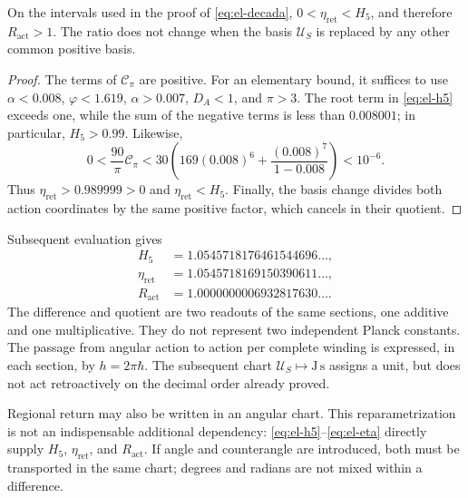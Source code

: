 \begin{proposition}
On the intervals used in the proof of \eqref{eq:el-decada},
\(0<\eta_{\mathrm{ret}}<H_5\), and therefore
\(R_{\mathrm{act}}>1\). The ratio does not change when the basis
\(\mathcal U_S\) is replaced by any other common positive basis.
\end{proposition}
\begin{proof}
The terms of \(\mathcal C_\pi\) are positive. For an elementary
bound, it suffices to use \(\alpha<0.008\), \(\varphi<1.619\),
\(\alpha>0.007\), \(D_A<1\), and \(\pi>3\). The root term in
\eqref{eq:el-h5} exceeds one, while the sum of the negative
terms is less than \(0.008001\); in particular, \(H_5>0.99\).
Likewise,
\[
 0<\frac{90}{\pi}\mathcal C_\pi
 <30\left(169(0.008)^6+
           \frac{(0.008)^7}{1-0.008}\right)<10^{-6}.
\]
Thus \(\eta_{\mathrm{ret}}>0.989999>0\) and
\(\eta_{\mathrm{ret}}<H_5\). Finally, the basis change divides
both action coordinates by the same positive factor, which cancels in
their quotient.
\end{proof}

Subsequent evaluation gives
\begin{align*}
 H_5&=1.0545718176461544696\ldots,\\
 \eta_{\mathrm{ret}}&=1.0545718169150390611\ldots,\\
 R_{\mathrm{act}}&=1.0000000006932817630\ldots.
\end{align*}
The difference and quotient are two readouts of the same sections,
one additive and one multiplicative. They do not represent two independent
Planck constants. The passage from angular action to action per complete
winding is expressed, in each section, by
\(h=2\pi\hbar\). The subsequent chart
\(\mathcal U_S\mapsto\mathrm{J\,s}\) assigns a unit, but does not
act retroactively on the decimal order already proved.

Regional return may also be written in an angular chart.
This reparametrization is not an indispensable additional dependency:
\eqref{eq:el-h5}--\eqref{eq:el-eta} directly supply
\(H_5\), \(\eta_{\mathrm{ret}}\), and \(R_{\mathrm{act}}\). If
angle and counterangle are introduced, both must be transported in the same
chart; degrees and radians are not mixed within a difference.


